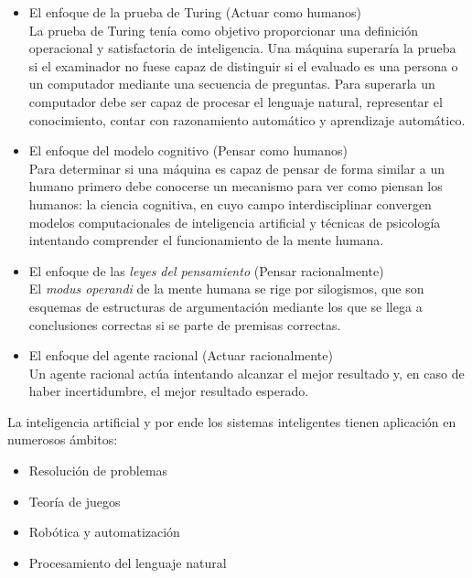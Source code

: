 \begin{itemize}
\item{El enfoque de la prueba de Turing (Actuar como humanos)}\\

  La prueba de Turing tenía como objetivo proporcionar una definición operacional y satisfactoria de inteligencia. Una máquina superaría la prueba si el examinador no fuese capaz de distinguir si el evaluado es una persona o un computador mediante una secuencia de preguntas. Para superarla un computador debe ser capaz de procesar el lenguaje natural, representar el conocimiento, contar con razonamiento automático y aprendizaje automático.
\item{El enfoque del modelo cognitivo (Pensar como humanos)}\\

Para determinar si una máquina es capaz de pensar de forma similar a un humano primero debe conocerse un mecanismo para ver como piensan los humanos: la ciencia cognitiva, en cuyo campo interdisciplinar convergen modelos computacionales de inteligencia artificial y técnicas de psicología intentando comprender el funcionamiento de la mente humana.
\item{El enfoque de las \textit{leyes del pensamiento} (Pensar racionalmente)}\\

  El \textit{modus operandi} de la mente humana se rige por silogismos, que son esquemas de estructuras de argumentación mediante los que se llega a conclusiones correctas si se parte de premisas correctas.
\item{El enfoque del agente racional (Actuar racionalmente)}\\

  Un agente racional actúa intentando alcanzar el mejor resultado y, en caso de haber incertidumbre, el mejor resultado esperado.
\end{itemize}
La inteligencia artificial y por ende los sistemas inteligentes tienen aplicación en numerosos ámbitos:
\begin{itemize}
\item{Resolución de problemas}
\item{Teoría de juegos}
\item{Robótica y automatización}
\item{Procesamiento del lenguaje natural}
\end{itemize}

